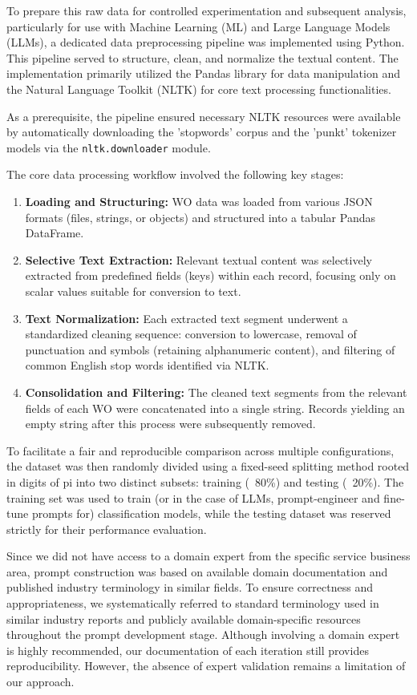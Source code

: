 To prepare this raw data for controlled experimentation and subsequent analysis, particularly for use with Machine Learning (ML) and Large Language Models (LLMs), a dedicated data preprocessing pipeline was implemented using Python. This pipeline served to structure, clean, and normalize the textual content. The implementation primarily utilized the Pandas library for data manipulation and the Natural Language Toolkit (NLTK) \cite{bird2009nlp} for core text processing functionalities.

As a prerequisite, the pipeline ensured necessary NLTK resources were available by automatically downloading the 'stopwords' corpus and the 'punkt' tokenizer models via the \verb|nltk.downloader| module.

The core data processing workflow involved the following key stages:

\begin{enumerate}
    \item \textbf{Loading and Structuring:} WO data was loaded from various JSON formats (files, strings, or objects) and structured into a tabular Pandas DataFrame.
    \item \textbf{Selective Text Extraction:} Relevant textual content was selectively extracted from predefined fields (keys) within each record, focusing only on scalar values suitable for conversion to text.
    \item \textbf{Text Normalization:} Each extracted text segment underwent a standardized cleaning sequence: conversion to lowercase, removal of punctuation and symbols (retaining alphanumeric content), and filtering of common English stop words identified via NLTK.
    \item \textbf{Consolidation and Filtering:} The cleaned text segments from the relevant fields of each WO were concatenated into a single string. Records yielding an empty string after this process were subsequently removed.
\end{enumerate}


To facilitate a fair and reproducible comparison across multiple configurations, the dataset was then randomly divided using a fixed-seed splitting method rooted in digits of pi into two distinct subsets: training (~80\%) and testing (~20\%). The training set was used to train (or in the case of LLMs, prompt-engineer and fine-tune prompts for) classification models, while the testing dataset was reserved strictly for their performance evaluation.

Since we did not have access to a domain expert from the specific service business area, prompt construction was based on available domain documentation and published industry terminology in similar fields. To ensure correctness and appropriateness, we systematically referred to standard terminology used in similar industry reports and publicly available domain-specific resources throughout the prompt development stage. Although involving a domain expert is highly recommended, our documentation of each iteration still provides reproducibility. However, the absence of expert validation remains a limitation of our approach.

